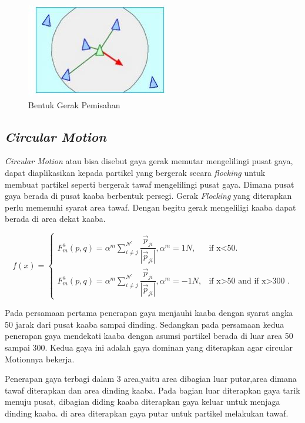 \begin{figure}
\centering
\includegraphics[scale=0.5]{gambar/separation}
\caption{Bentuk Gerak Pemisahan\citep{Reynolds1987}}
\end{figure}

\subsection{\emph{Circular Motion}}\label{sec:circularmotion}
\hspace{0.5cm}\emph{Circular Motion} atau bisa disebut gaya gerak memutar mengelilingi pusat gaya, dapat diaplikasikan kepada partikel yang bergerak secara \textit{flocking} untuk membuat partikel seperti bergerak tawaf mengelilingi pusat gaya. Dimana pusat gaya berada di pusat kaaba berbentuk persegi. Gerak \textit{Flocking} yang diterapkan perlu memenuhi syarat area tawaf. Dengan begitu gerak mengeliligi kaaba dapat berada di area dekat kaaba.

\[
  f(x)=\begin{cases}
    F_m^a(p,q) = \alpha^m \sum^{N^c}_{i \neq j}\dfrac{\vec{p}_{ji}}{|\vec{p}_{ji}|},\alpha^m = 1N , & \text{if x<50}.\\
    F_m^a(p,q) = \alpha^m \sum^{N^c}_{i \neq j}\dfrac{\vec{p}_{ji}}{|\vec{p}_{ji}|},\alpha^m = -1N, & \text{if x>50 and if x>300 }.
  \end{cases}
\]

\hspace{0.5cm}Pada persamaan pertama penerapan gaya menjauhi kaaba dengan syarat angka 50 jarak dari pusat kaaba sampai dinding. Sedangkan pada persamaan kedua penerapan gaya mendekati kaaba dengan asumsi partikel berada di luar area 50 sampai 300. Kedua gaya ini adalah gaya dominan yang diterapkan agar circular Motionnya bekerja.


\hspace{0.5cm}Penerapan gaya terbagi dalam 3 area,yaitu area dibagian luar putar,area dimana tawaf diterapkan dan area dinding kaaba. Pada bagian luar diterapkan gaya tarik menuju pusat, dibagian diding kaaba diterapkan gaya keluar untuk menjaga dinding kaaba. di area diterapkan gaya putar untuk partikel melakukan tawaf.



